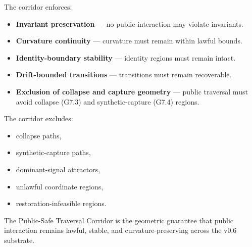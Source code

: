 \medskip

\noindent The corridor enforces:

\begin{itemize}
    \item \textbf{Invariant preservation} — no public interaction may violate
    invariants.
    \item \textbf{Curvature continuity} — curvature must remain within lawful
    bounds.
    \item \textbf{Identity-boundary stability} — identity regions must remain
    intact.
    \item \textbf{Drift-bounded transitions} — transitions must remain
    recoverable.
    \item \textbf{Exclusion of collapse and capture geometry} — public traversal
    must avoid collapse (G7.3) and synthetic-capture (G7.4) regions.
\end{itemize}

\medskip

\noindent The corridor excludes:

\begin{itemize}
    \item collapse paths,
    \item synthetic-capture paths,
    \item dominant-signal attractors,
    \item unlawful coordinate regions,
    \item restoration-infeasible regions.
\end{itemize}

\medskip

\noindent The Public-Safe Traversal Corridor is the geometric guarantee that
public interaction remains lawful, stable, and curvature-preserving across the
v0.6 substrate.



